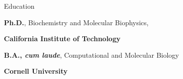 \begin{rubric}{Education}

	\entry*[2013--2018]
		\textbf{Ph.D.}, Biochemistry and Molecular Biophysics,
		\par \textbf{California Institute of Technology}
	
	\entry*[2009--2013]%
		\textbf{B.A., \emph{cum laude}}, Computational and Molecular Biology
		\par \textbf{Cornell University}
	
	\end{rubric}